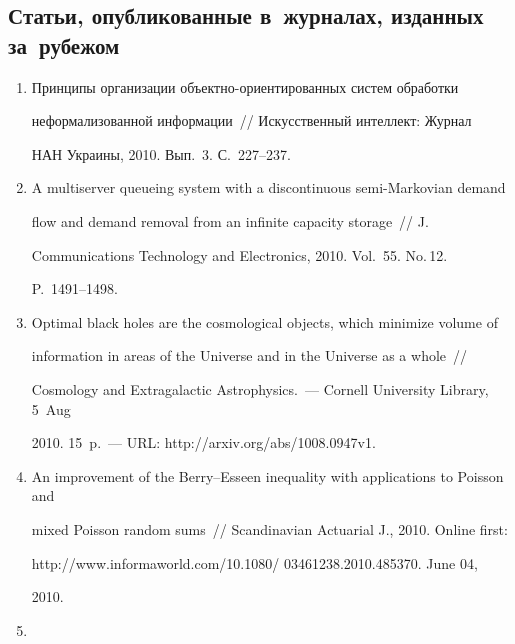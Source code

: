 \subsection{Статьи, опубликованные в~журналах, изданных за~рубежом} %





\noindent


\begin{enumerate}[1.]


\item {}


Принципы организации объект\-но-ориентированных сис\-тем обработки 


неформализованной информации~/\!\!/  Искусственный интеллект: Журнал 


НАН Украины, 2010. Вып.~3. С.~227--237.


\item {}


A  multiserver  queueing  system  with  a discontinuous semi-Markovian demand 


flow and demand removal from an infinite capacity storage~/\!\!/  J.  


Communications Technology and Electronics, 2010. Vol.~55. No.\,12. 


P.~1491--1498.


\item {}


Optimal black holes are the cosmological objects, which minimize volume of 


information in areas of the Universe and in the Universe as a whole~/\!\!/  


Cosmology and Extragalactic Astrophysics.~--- Cornell University Library, 5~Aug 


2010. 15~p.~--- URL: {\sf http://arxiv.org/abs/1008.0947v1}. 


\item {}


An improvement of the Berry--Esseen inequality with applications to Poisson and 


mixed Poisson random sums~/\!\!/  Scandinavian Actuarial J., 2010. Online first: 


{\sf http://www.informaworld.com/10.1080/ 03461238.2010.485370}. June 04, 


2010.


\item {}



\end{enumerate}

